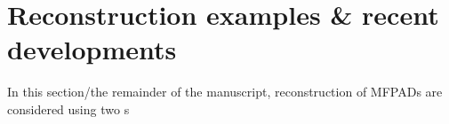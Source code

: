 \section{Reconstruction examples & recent developments}

In this section/the remainder of the manuscript, reconstruction of MFPADs are considered using two s